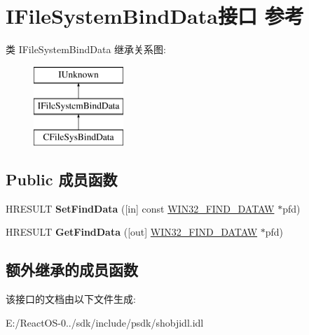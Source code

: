 \hypertarget{interface_i_file_system_bind_data}{}\section{I\+File\+System\+Bind\+Data接口 参考}
\label{interface_i_file_system_bind_data}
类 I\+File\+System\+Bind\+Data 继承关系图\+:\begin{figure}[H]
\begin{center}
\leavevmode
\includegraphics[height=3.000000cm]{interface_i_file_system_bind_data}
\end{center}
\end{figure}
\subsection*{Public 成员函数}
\begin{DoxyCompactItemize}
\item 
\mbox{\label{interface_i_file_system_bind_data_a3f736267a211f431e7b5cad13a8baea9}} 
H\+R\+E\+S\+U\+LT {\bfseries Set\+Find\+Data} (\mbox{[}in\mbox{]} const \hyperlink{struct_w_i_n32___f_i_n_d___d_a_t_a_a}{W\+I\+N32\+\_\+\+F\+I\+N\+D\+\_\+\+D\+A\+T\+AW} $\ast$pfd)
\item 
\mbox{\label{interface_i_file_system_bind_data_ac92012da9904f3210d45336751a0c524}} 
H\+R\+E\+S\+U\+LT {\bfseries Get\+Find\+Data} (\mbox{[}out\mbox{]} \hyperlink{struct_w_i_n32___f_i_n_d___d_a_t_a_a}{W\+I\+N32\+\_\+\+F\+I\+N\+D\+\_\+\+D\+A\+T\+AW} $\ast$pfd)
\end{DoxyCompactItemize}
\subsection*{额外继承的成员函数}


该接口的文档由以下文件生成\+:\begin{DoxyCompactItemize}
\item 
E\+:/\+React\+O\+S-\/0../sdk/include/psdk/shobjidl.\+idl\end{DoxyCompactItemize}
